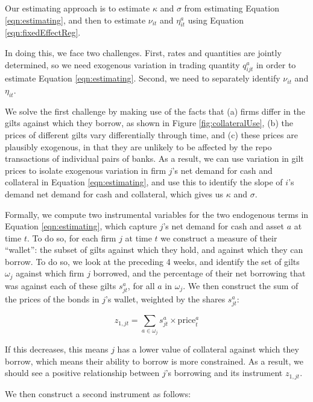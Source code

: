Our estimating approach is to estimate $\kappa$ and $\sigma$ from estimating Equation \ref{eqn:estimating}, and then to estimate $\nu_{it}$ and $\eta^a_{it}$ using Equation \ref{eqn:fixedEffectReg}. 

In doing this, we face two challenges. First, rates and quantities are jointly determined, so we need exogenous variation in trading quantity $q^a_{ijt}$ in order to estimate Equation \ref{eqn:estimating}. Second, we need to separately identify $\nu_{it}$ and $\eta_{it}$.

We solve the first challenge by making use of the facts that (a) firms differ in the gilts against which they borrow, as shown in Figure \ref{fig:collateralUse}, (b) the prices of different gilts vary differentially through time, and (c) these prices are plausibly exogenous, in that they are unlikely to be affected by the repo transactions of individual pairs of banks. As a result, we can use variation in gilt prices to isolate exogenous variation in firm $j$'s net demand for cash and collateral in Equation \ref{eqn:estimating}, and use this to identify the slope of $i$'s demand net demand for cash and collateral, which gives us $\kappa$ and $\sigma$.

Formally, we compute two instrumental variables for the two endogenous terms in Equation \ref{eqn:estimating}, which capture $j$'s net demand for cash and asset $a$ at time $t$. To do so, for each firm $j$ at time $t$ we construct a measure of their ``wallet'': the subset of gilts against which they hold, and against which they can borrow. To do so, we look at the preceding 4 weeks, and identify the set of gilts $\omega_j$ against which firm $j$ borrowed, and the percentage of their net borrowing that was against each of these gilts $s_{jt}^a$, for all $a$ in $\omega_j$. We then construct the sum of the prices of the bonds in $j$'s wallet, weighted by the shares $s_{jt}^a$: 

\begin{equation}\label{eq:firstInstrument}
    z_{1,jt}=\sum_{a \in \omega_j}s_{jt}^a \times\text{price}^a_{t}
\end{equation}

If this decreases, this means $j$ has a lower value of collateral against which they borrow, which means their ability to borrow is more constrained. As a result, we should see a positive relationship between $j$'s borrowing and its instrument $z_{1,jt}$.

We then construct a second instrument as follows:

